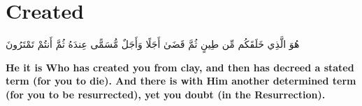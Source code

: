 \chapter{Created}
\begin{center}
    {\Huge    
        \begin{Arabic}
            هُوَ الَّذِي خَلَقَكُم مِّن طِينٍ ثُمَّ قَضَىٰ أَجَلًا وَأَجَلٌ مُّسَمًّى عِندَهُ ثُمَّ أَنتُمْ تَمْتَرُونَ
        \end{Arabic}
    }    
\end{center}
\vspace*{\fill}
\vspace{3cm}
\begin{center}
    \large \textbf{He it is Who has created you from clay, and then has decreed a stated term (for you to die). And there is with Him another determined term (for you to be resurrected), yet you doubt (in the Resurrection).}
\end{center}
